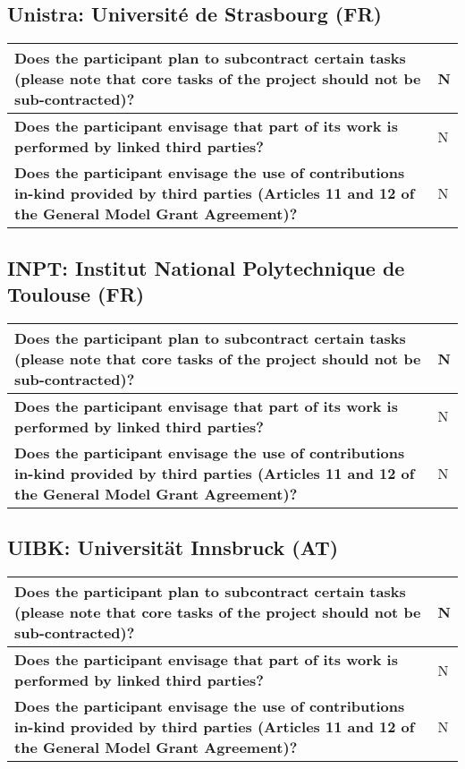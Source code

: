 \subsection{Unistra: Université de Strasbourg (FR)}

\begin{longtable}{|p{}|p{}|}
\hline
{\bf Does the participant plan to subcontract certain tasks (please
  note that core tasks of the project should not be sub-contracted)?}
&
N
\\
\hline
{\bf Does the participant envisage that  part of its work is performed
  by linked third parties?}
&
N
\\
\hline
{\bf Does the participant envisage the use of contributions in-kind
provided by third parties (Articles 11 and 12 of the General Model
Grant Agreement)?}
&
N
\\
\hline
\end{longtable}


\subsection{INPT: Institut National Polytechnique de Toulouse (FR)}

\begin{longtable}{|p{}|p{}|}
\hline
{\bf Does the participant plan to subcontract certain tasks (please
  note that core tasks of the project should not be sub-contracted)?}
&
N
\\
\hline
{\bf Does the participant envisage that  part of its work is performed
  by linked third parties?}
&
N
\\
\hline
{\bf Does the participant envisage the use of contributions in-kind
provided by third parties (Articles 11 and 12 of the General Model
Grant Agreement)?}
&
N
\\
\hline
\end{longtable}

\subsection{UIBK: Universität Innsbruck (AT)}

\begin{longtable}{|p{}|p{}|}
\hline
{\bf Does the participant plan to subcontract certain tasks (please
  note that core tasks of the project should not be sub-contracted)?}
&
N
\\
\hline
{\bf Does the participant envisage that  part of its work is performed
  by linked third parties?}
&
N
\\
\hline
{\bf Does the participant envisage the use of contributions in-kind
provided by third parties (Articles 11 and 12 of the General Model
Grant Agreement)?}
&
N
\\
\hline
\end{longtable}

